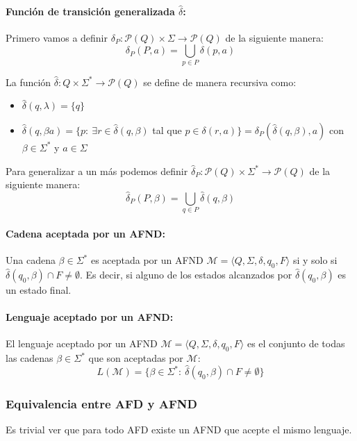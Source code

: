 \paragraph{Función de transición generalizada \(\hat{\delta}\):} Primero vamos a definir \(\delta_P : \mathcal{P}(Q)\times\Sigma\to\mathcal{P}(Q)\) de la siguiente manera:
\[ \delta_P(P,a) = \underset{p\in P}{\bigcup}\delta(p,a)\]

La función \(\hat{\delta} : Q\times\Sigma^*\to \mathcal{P}(Q)\) se define de manera recursiva como:
\begin{itemize}
  \item \(\hat{\delta}(q,\lambda)=\{q\}\)
  \item \(\hat{\delta}(q,\beta a)= \{ p:~\exists r\in\hat{\delta}(q,\beta)\) tal que \(p \in \delta(r, a)\} = \delta_P(\hat{\delta}(q, \beta), a)\) con \(\beta\in\Sigma^*\) y \(a\in\Sigma\)
\end{itemize}

Para generalizar a un más podemos definir \(\hat{\delta}_P : \mathcal{P}(Q)\times\Sigma^*\to\mathcal{P}(Q)\) de la siguiente manera:
\[ \hat{\delta}_P(P,\beta) = \underset{q\in P}{\bigcup}\hat{\delta}(q,\beta)\]

\paragraph{Cadena aceptada por un AFND:} Una cadena \(\beta\in\Sigma^*\) es aceptada por un AFND \(\mathcal{M} = \langle Q, \Sigma, \delta, q_0, F\rangle\) si y solo si \(\hat{\delta}(q_0,\beta)\cap F \neq \emptyset\). Es decir, si alguno de los estados alcanzados por \(\hat{\delta}(q_0,\beta)\) es un estado final.

\paragraph{Lenguaje aceptado por un AFND:} El lenguaje aceptado por un AFND \(\mathcal{M} = \langle Q, \Sigma, \delta, q_0, F\rangle\) es el conjunto de todas las cadenas \(\beta\in\Sigma^*\) que son aceptadas por \(\mathcal{M}\):
\[ L(\mathcal{M}) = \{ \beta\in\Sigma^*:~\hat{\delta}(q_0,\beta)\cap F \neq \emptyset\}\]

\subsubsection{Equivalencia entre AFD y AFND}
Es trivial ver que para todo AFD existe un AFND que acepte el mismo lenguaje.

